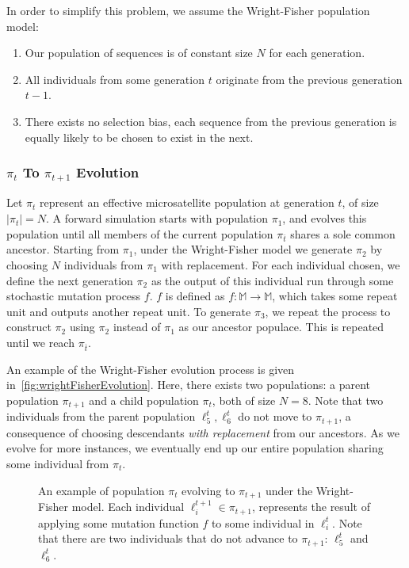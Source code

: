 In order to simplify this problem, we assume the Wright-Fisher population model:
\begin{enumerate}
    \item Our population of sequences is of constant size $N$ for each generation.
    \item All individuals from some generation $t$ originate from the previous generation $t - 1$.
    \item There exists no selection bias, each sequence from the previous generation is equally likely to be
        chosen to exist in the next.
\end{enumerate}

\subsubsection{$\pi_t$ To $\pi_{t+1}$ Evolution}
Let $\pi_t$ represent an effective microsatellite population at generation $t$, of size $\left|\pi_t \right| = N$.
A forward simulation starts with population $\pi_1$, and evolves this population until all members of the current
population $\pi_{\overbar{t}}$ shares a sole common ancestor.
Starting from $\pi_1$, under the Wright-Fisher model we generate $\pi_2$ by choosing $N$ individuals from $\pi_1$ with
replacement.
For each individual chosen, we define the next generation $\pi_2$ as the output of this individual run through some
stochastic mutation process $f$.
$f$ is defined as $f : \mathbb{M} \rightarrow \mathbb{M}$, which takes some repeat unit and outputs another
repeat unit.
To generate $\pi_3$, we repeat the process to construct $\pi_2$ using $\pi_2$ instead of $\pi_1$ as our ancestor
populace.
This is repeated until we reach $\pi_{\overbar{t}}$.

An example of the Wright-Fisher evolution process is given in~\autoref{fig:wrightFisherEvolution}.
Here, there exists two populations: a parent population $\pi_{t+1}$ and a child population $\pi_t$, both of size $N=8$.
Note that two individuals from the parent population $\ell_5^t, \ell_6^t$ do not move to $\pi_{t+1}$, a consequence of
choosing descendants \emph{with replacement} from our ancestors.
As we evolve for more instances, we eventually end up our entire population sharing some individual from $\pi_t$.

\begin{figure}[t]
    \centering{}
    \caption{An example of population $\pi_{t}$ evolving to $\pi_{t+1}$ under the Wright-Fisher model.
    Each individual $\ell^{t+1}_i \in \pi_{t+1}$, represents the result of applying some mutation function $f$ to
    some individual in $\ell^t_i$.
    Note that there are two individuals that do not advance to $\pi_{t+1}$: $\ell^t_5$ and $\ell^t_6$.}
    \label{fig:wrightFisherEvolution}
\end{figure}

